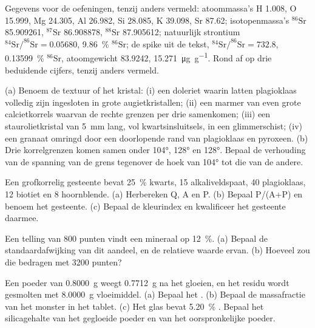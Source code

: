 Gegevens voor de oefeningen, tenzij anders vermeld: atoommassa's H 1.008, O 15.999, Mg 24.305, Al
26.982, Si 28.085, K 39.098, Sr 87.62; isotopenmassa's $^{86}\mathrm{Sr}$ 85.909261,
$^{87}\mathrm{Sr}$ 86.908878, $^{88}\mathrm{Sr}$ 87.905612; natuurlijk strontium
$^{84}\mathrm{Sr}/^{86}\mathrm{Sr} = 0.05680$, \qty{9.86}{\percent} $^{86}\mathrm{Sr}$; de spike
uit de tekst, $^{84}\mathrm{Sr}/^{86}\mathrm{Sr} = 732.8$, \qty{0.13599}{\percent}
$^{86}\mathrm{Sr}$, atoomgewicht 83.9242, \qty{15.271}{\micro\gram\per\gram}. Rond af op drie
beduidende cijfers, tenzij anders vermeld.

\begin{exercise}[$\star$]\label{exo:b2:field-lab-methods-2:1}
(a) Benoem de textuur of het kristal: (i) een doleriet waarin latten plagioklaas volledig zijn ingesloten in
grote augietkristallen; (ii) een marmer van even grote calcietkorrels waarvan de rechte grenzen per
drie samenkomen; (iii) een staurolietkristal van \qty{5}{mm} lang, vol kwartsinsluitsels, in een glimmerschist;
(iv) een granaat omringd door een doorlopende rand van plagioklaas en pyroxeen. (b) Drie korrelgrenzen
komen samen onder \ang{104}, \ang{128} en \ang{128}. Bepaal de verhouding van de spanning van de grens tegenover
de hoek van \ang{104} tot die van de andere.
\end{exercise}

\begin{exercise}[$\star$]\label{exo:b2:field-lab-methods-2:2}
Een grofkorrelig gesteente bevat \qty{25}{\percent} kwarts, 15 alkaliveldspaat, 40 plagioklaas, 12
biotiet en 8 hoornblende. (a) Herbereken Q, A en P. (b) Bepaal P/(A+P) en benoem het gesteente. (c) Bepaal
de kleurindex en kwalificeer het gesteente daarmee.
\end{exercise}

\begin{exercise}[$\star$]\label{exo:b2:field-lab-methods-2:3}
Een telling van 800 punten vindt een mineraal op \qty{12}{\percent}. (a) Bepaal de standaardafwijking van
dit aandeel, en de relatieve waarde ervan. (b) Hoeveel zou die bedragen met 3200 punten?
\end{exercise}

\begin{exercise}[$\star$]\label{exo:b2:field-lab-methods-2:4}
Een poeder van \qty{0.8000}{g} weegt \qty{0.7712}{g} na het gloeien, en het residu wordt gesmolten met
\qty{8.0000}{g} vloeimiddel. (a) Bepaal het . (b) Bepaal de massafractie van het monster in
het tablet. (c) Het glas bevat \qty{5.20}{\percent} . Bepaal het silicagehalte van het gegloeide poeder
en van het oorspronkelijke poeder.
\end{exercise}

